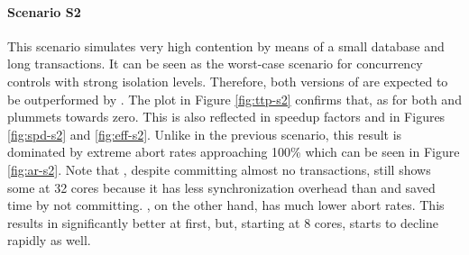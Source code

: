 \paragraph{Scenario S2}

This scenario simulates very high contention by means of a small database and
long transactions. It can be seen as the worst-case scenario for concurrency
controls with strong isolation levels. Therefore, both versions of \midas are
expected to be outperformed by \echo. The plot in Figure \ref{fig:ttp-s2}
confirms that, as \ttp for both \midas and \midasopt plummets towards zero. This
is also reflected in speedup factors and \eff in Figures \ref{fig:spd-s2} and
\ref{fig:eff-s2}. Unlike in the previous scenario, this result is dominated by
extreme abort rates approaching 100\% which can be seen in Figure
\ref{fig:ar-s2}. Note that \midasopt, despite committing almost no transactions,
still shows some \tput at 32 cores because it has less synchronization overhead
than \midas and saved time by not committing. \echo, on the other hand, has much
lower abort rates. This results in significantly better \ttp at first, but, starting at 8 cores, \tput starts to decline rapidly as well.

